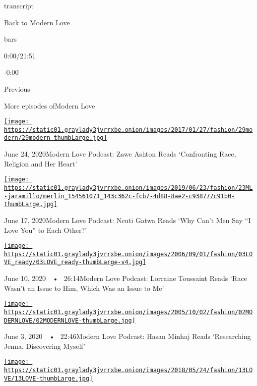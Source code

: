 transcript

Back to Modern Love

bars

0:00/21:51

-0:00

Previous

More episodes ofModern Love

\href{https://www.nytimes3xbfgragh.onion/2020/06/24/style/modern-love-podcast-zawe-ashton.html?action=click\&module=audio-series-bar\&region=header\&pgtype=Article}{\texttt{[image: https://static01.graylady3jvrrxbe.onion/images/2017/01/27/fashion/29modern/29modern-thumbLarge.jpg]}}

June 24, 2020Modern Love Podcast: Zawe Ashton Reads `Confronting Race,
Religion and Her Heart'

\href{https://www.nytimes3xbfgragh.onion/2020/06/17/style/modern-love-podcast-ncuti-gatwa.html?action=click\&module=audio-series-bar\&region=header\&pgtype=Article}{\texttt{[image: https://static01.graylady3jvrrxbe.onion/images/2019/06/23/fashion/23ML-jaramillo/merlin\_154561071\_143c362c-fcb7-4d88-8ae2-c938777c91b0-thumbLarge.jpg]}}

June 17, 2020Modern Love Podcast: Ncuti Gatwa Reads `Why Can't Men Say
``I Love You'' to Each Other?'

\href{https://www.nytimes3xbfgragh.onion/2020/06/10/style/modern-love-podcast-lorraine-toussant-updated-poscript.html?action=click\&module=audio-series-bar\&region=header\&pgtype=Article}{\texttt{[image: https://static01.graylady3jvrrxbe.onion/images/2006/09/01/fashion/03LOVE\_ready/03LOVE\_ready-thumbLarge-v4.jpg]}}

June 10, 2020~~•~ 26:14Modern Love Podcast: Lorraine Toussaint Reads
`Race Wasn't an Issue to Him, Which Was an Issue to Me'

\href{https://www.nytimes3xbfgragh.onion/2020/06/03/style/modern-love-podcast-hasan-minhaj.html?action=click\&module=audio-series-bar\&region=header\&pgtype=Article}{\texttt{[image: https://static01.graylady3jvrrxbe.onion/images/2005/10/02/fashion/02MODERNLOVE/02MODERNLOVE-thumbLarge.jpg]}}

June 3, 2020~~•~ 22:46Modern Love Podcast: Hasan Minhaj Reads
`Researching Jenna, Discovering Myself'

\href{https://www.nytimes3xbfgragh.onion/2020/05/27/style/modern-love-podcast-saoirse-ronan.html?action=click\&module=audio-series-bar\&region=header\&pgtype=Article}{\texttt{[image: https://static01.graylady3jvrrxbe.onion/images/2018/05/24/fashion/13LOVE/13LOVE-thumbLarge.jpg]}}

